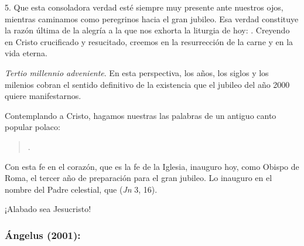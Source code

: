 \begin{body}
	5. Que esta consoladora verdad esté siempre muy presente ante nuestros ojos, mientras caminamos como peregrinos hacia el gran jubileo. Esa verdad constituye la razón última de la alegría a la que nos exhorta la liturgia de hoy: . Creyendo en Cristo crucificado y resucitado, creemos en la resurrección de la carne y en la vida eterna. 
	
	\emph{Tertio millennio adveniente}. En esta perspectiva, los años, los siglos y los milenios cobran el sentido definitivo de la existencia que el jubileo del año 2000 quiere manifestarnos. 
	
	Contemplando a Cristo, hagamos nuestras las palabras de un antiguo canto popular polaco: 
	
	\begin{quote} 
		.
	\end{quote} 
	
	Con esta fe en el corazón, que es la fe de la Iglesia, inauguro hoy, como Obispo de Roma, el tercer año de preparación para el gran jubileo. Lo inauguro en el nombre del Padre celestial, que  (\emph{Jn} 3, 16). 
	
	¡Alabado sea Jesucristo!
	
\end{body}

\subsubsection{Ángelus (2001): }


